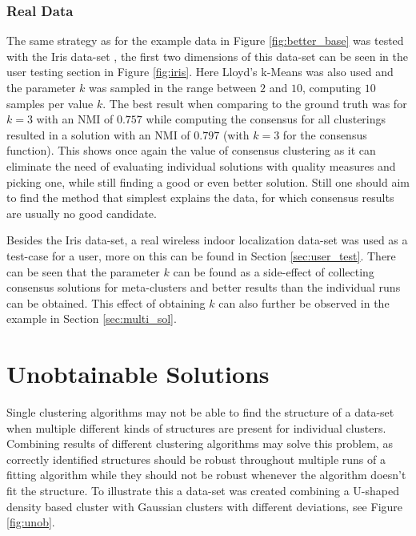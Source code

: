 \documentclass[
	a4paper,
	english,
	twoside,
	openright,               
	11pt                            
	]{report}
\begin{document}
\subsubsection{Real Data}

The same strategy as for the example data in Figure \ref{fig:better_base} was tested with the Iris data-set \cite{Dua:2019}, the first two dimensions of this data-set can be seen in the user testing section in Figure \ref{fig:iris}. Here Lloyd's k-Means was also used and the parameter $k$ was sampled in the range between $2$ and $10$, computing $10$ samples per value $k$. The best result when comparing to the ground truth was for $k=3$ with an NMI of $0.757$ while computing the consensus for all clusterings resulted in a solution with an NMI of $0.797$ (with $k=3$ for the consensus function). This shows once again the value of consensus clustering as it can eliminate the need of evaluating individual solutions with quality measures and picking one, while still finding a good or even better solution. Still one should aim to find the method that simplest explains the data, for which consensus results are usually no good candidate. 

Besides the Iris data-set, a real wireless indoor localization data-set \cite{wireless} was used as a test-case for a user, more on this can be found in Section \ref{sec:user_test}. There can be seen that the parameter $k$ can be found as a side-effect of collecting consensus solutions for meta-clusters and better results than the individual runs can be obtained. This effect of obtaining $k$ can also further be observed in the example in Section \ref{sec:multi_sol}.

\section{Unobtainable Solutions}\label{sec:unob}
Single clustering algorithms may not be able to find the structure of a data-set when multiple different kinds of structures are present for individual clusters. Combining results of different clustering algorithms may solve this problem, as correctly identified structures should be robust throughout multiple runs of a fitting algorithm while they should not be robust whenever the algorithm doesn't fit the structure. To illustrate this a data-set was created combining a U-shaped density based cluster with Gaussian clusters with different deviations, see Figure \ref{fig:unob}.
\end{document}
